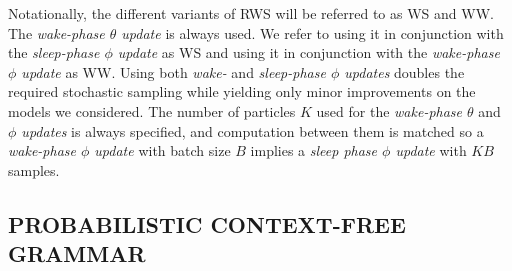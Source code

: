 %

Notationally, the different variants of \gls{RWS} will be referred to as \gls{WS} and \gls{WW}.
The \emph{wake-phase $\theta$ update} is always used.
We refer to using it in conjunction with the \emph{sleep-phase $\phi$ update} as \acrshort{WS} and using it in conjunction with the \emph{wake-phase $\phi$ update} as \acrshort{WW}.
Using both \emph{wake-} and \emph{sleep-phase $\phi$ updates} doubles the required stochastic sampling while yielding only minor improvements on the models we considered.
%
The number of particles $K$ used for the \emph{wake-phase $\theta$} and \emph{$\phi$ updates} is always specified, and computation between them is matched so
a \emph{wake-phase $\phi$ update} with batch size $B$ implies a \emph{sleep phase $\phi$ update} with $KB$ samples.

\subsection{PROBABILISTIC CONTEXT-FREE GRAMMAR}
\label{sec:experiments/pcfg}

